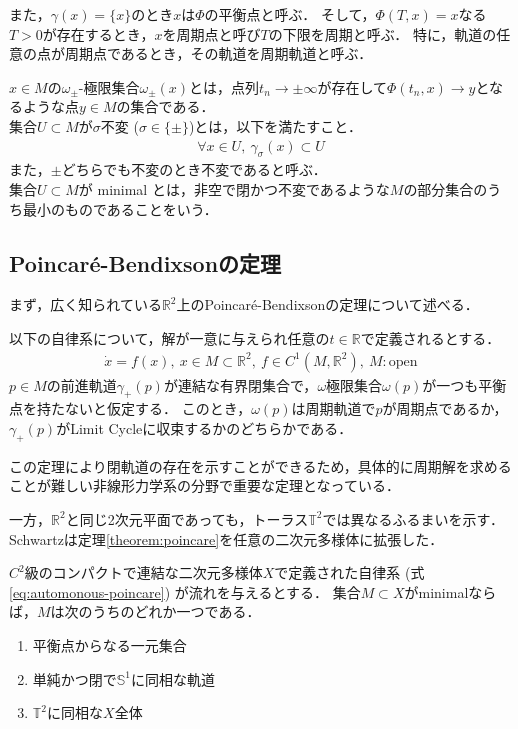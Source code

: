 \documentclass[../main]{subfiles}
\begin{document}
また，$\gamma(x)=\{x\}$のとき$x$は$\Phi$の平衡点と呼ぶ．
そして，$\Phi(T,x)=x$なる$T>0$が存在するとき，$x$を周期点と呼び$T$の下限を周期と呼ぶ．
特に，軌道の任意の点が周期点であるとき，その軌道を周期軌道と呼ぶ．

$x\in M$の$\omega_\pm$-極限集合$\omega_\pm(x)$とは，点列$t_n\to \pm\infty$が存在して$\Phi(t_n,x)\to y$となるような点$y\in M$の集合である．\\
集合$U\subset M$が$\sigma$不変 ($\sigma\in\{\pm\}$)とは，以下を満たすこと．
\begin{align*}
    \forall x\in U,\ \gamma_\sigma (x)\subset U
\end{align*}
また，$\pm$どちらでも不変のとき不変であると呼ぶ．\\
集合$U\subset M$が minimal とは，非空で閉かつ不変であるような$M$の部分集合のうち最小のものであることをいう．
\subsection{Poincaré-Bendixsonの定理}
まず，広く知られている$\mathbb{R}^2$上のPoincaré-Bendixsonの定理について述べる．
\begin{theorem}
    以下の自律系について，解が一意に与えられ任意の$t\in\mathbb{R}$で定義されるとする．
    \begin{align}
        \dot{x}=f(x),\ x\in M\subset \mathbb{R}^2,\ f\in C^1(M,\mathbb{R}^2),\ M:\mathrm{open}         \label{eq:automonous-poincare}
    \end{align}
    $p\in M$の前進軌道$\gamma_+(p)$が連結な有界閉集合で，$\omega$極限集合$\omega(p)$が一つも平衡点を持たないと仮定する．
    このとき，$\omega(p)$は周期軌道で$p$が周期点であるか，$\gamma_+(p)$がLimit Cycleに収束するかのどちらかである．
    \label{theorem:poincare}
\end{theorem}
この定理により閉軌道の存在を示すことができるため，具体的に周期解を求めることが難しい非線形力学系の分野で重要な定理となっている．

一方，$\mathbb{R}^2$と同じ2次元平面であっても，トーラス$\mathbb{T}^2$では異なるふるまいを示す．
Schwartzは定理\ref{theorem:poincare}を任意の二次元多様体に拡張した\cite{Schwartz1963ErrataAG}．
\begin{theorem}
    $C^2$級のコンパクトで連結な二次元多様体$X$で定義された自律系 (式\eqref{eq:automonous-poincare}) が流れを与えるとする．
    集合$M\subset X$がminimalならば，$M$は次のうちのどれか一つである．
    \begin{enumerate}
        \item 平衡点からなる一元集合
        \item 単純かつ閉で$\mathbb{S}^1$に同相な軌道
        \item $\mathbb{T}^2$に同相な$X$全体
    \end{enumerate}
\end{theorem}
\end{document}
